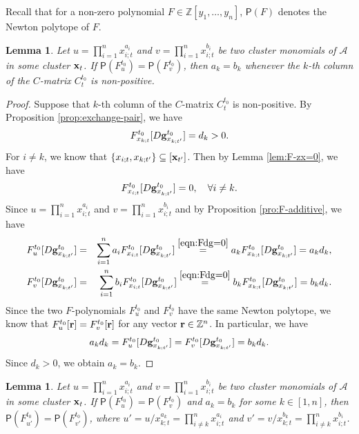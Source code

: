 \documentclass[10pt]{amsart}
\newtheorem{lemma}[theorem]{Lemma}
\theoremstyle{definition}
\theoremstyle{remark}
\numberwithin{equation}{section}
\begin{document}
Recall that for a non-zero polynomial $F\in\mathbb Z[y_1,\ldots, y_n]$, $\mathsf P(F)$ denotes the Newton polytope of $F$.
\begin{lemma}\label{lem:ak=bk}
Let $u=\prod_{i=1}^nx_{i;t}^{a_i}$ and $v=\prod_{i=1}^nx_{i;t}^{b_i}$ be two cluster monomials of $\mathcal A$ in some cluster ${\bf x}_t$. If $\mathsf P(F_u^{t_0})=\mathsf P(F_{v}^{t_0})$, then $a_k=b_k$ whenever the $k$-th column of the $C$-matrix $C_t^{t_0}$ is non-positive.
\end{lemma}

\begin{proof}
Suppose that $k$-th column of the $C$-matrix $C_t^{t_0}$ is non-positive. By Proposition \ref{prop:exchange-pair}, we have \[F_{x_{k;t}}^{t_0}[D{\bf g}_{x_{k;t'}}^{t_0}]=d_k>0.\] For $i\neq k$, we know that 
$\{x_{i;t}, x_{k;t'}\}\subseteq [{\bf x}_{t'}]$. 
Then by Lemma \ref{lem:F-zx=0}, we have
\begin{eqnarray}\label{eqn:Fdg=0}
   F_{x_{i;t}}^{t_0}[D{\bf g}_{x_{k;t'}}^{t_0}]=0, \quad \forall i\neq k. 
\end{eqnarray}
Since $u=\prod_{i=1}^nx_{i;t}^{a_i}$ and $v=\prod_{i=1}^nx_{i;t}^{b_i}$ and
by Proposition \ref{pro:F-additive}, we have
\begin{eqnarray*}
 F_u^{t_0}[D{\bf g}_{x_{k;t'}}^{t_0}]&=&\sum_{i=1}^na_iF_{x_{i;t}}^{t_0}[D{\bf g}_{x_{k;t'}}^{t_0}] \overset{\eqref{eqn:Fdg=0}}{=}a_kF_{x_{k;t}}^{t_0}[D{\bf g}_{x_{k;t'}}^{t_0}]=a_kd_k,\\
 F_{v}^{t_0}[D{\bf g}_{x_{k;t'}}^{t_0}]&=&\sum_{i=1}^nb_iF_{x_{i;t}}^{t_0}[D{\bf g}_{x_{k;t'}}^{t_0}] \overset{\eqref{eqn:Fdg=0}} {=}b_kF_{x_{k;t}}^{t_0}[D{\bf g}_{x_{k;t'}}^{t_0}]=b_kd_k.
\end{eqnarray*}
Since the two $F$-polynomials $F_{u}^{t_0}$ and  $F_{v}^{t_0}$ have the same Newton polytope, we know that $F_u^{t_0}[{\bf r}]=F_{v}^{t_0}[{\bf r}]$ for any vector ${\bf r}\in\mathbb Z^n$. In particular, we have
\[ a_kd_k= F_u^{t_0}[D{\bf g}_{x_{k;t'}}^{t_0}]=F_{v}^{t_0}[D{\bf g}_{x_{k;t'}}^{t_0}]=b_kd_k.
\]
Since $d_k>0$, we obtain $a_k=b_k$.
\end{proof}

\begin{lemma}\label{lem:v-v1}
   Let $u=\prod_{i=1}^nx_{i;t}^{a_i}$ and $v=\prod_{i=1}^nx_{i;t}^{b_i}$ be two cluster monomials of $\mathcal A$ in some cluster ${\bf x}_t$. If  $\mathsf P(F_u^{t_0})=\mathsf P(F_{v}^{t_0})$ and $a_k=b_k$ for some $k\in[1,n]$, then  $\mathsf P(F_{u'}^{t_0})=\mathsf P(F_{v'}^{t_0})$, where $u'=u/x_{k;t}^{a_k}=\prod_{i\neq k}^nx_{i;t}^{a_i}$ and $v'=v/x_{k;t}^{b_k}=\prod_{i\neq k }^nx_{i;t}^{b_i}$.
\end{lemma}
\end{document}
